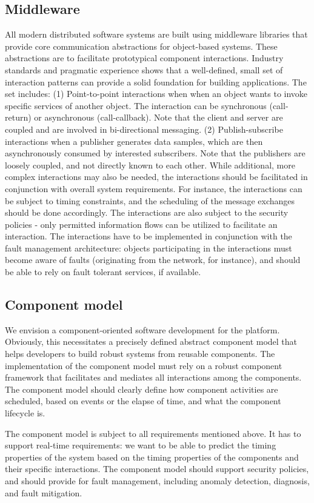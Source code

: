 \subsection{Middleware}
All modern distributed software systems are built using middleware
libraries that provide core communication abstractions for
object-based systems. These abstractions are to facilitate
prototypical component interactions. Industry standards and
pragmatic experience shows that a well-defined, small set of 
interaction patterns can provide a solid foundation for building
applications. The set includes: (1) Point-to-point interactions when
when an object wants to invoke specific services of another object. 
The interaction can be synchronous (call-return) or  asynchronous (call-callback). 
Note that the client and server are coupled and are involved in bi-directional messaging.
(2) Publish-subscribe interactions when a publisher generates data samples, 
which are then asynchronously consumed by interested subscribers. Note that the
publishers are loosely coupled, and not directly known to each other. 
While additional, more complex interactions may also be needed, the interactions
should be facilitated in conjunction with overall system requirements.
For instance, the interactions can be subject to timing constraints, and the scheduling
of the message exchanges should be done accordingly. The interactions
are also subject to the security policies - only permitted information
flows can be utilized to facilitate an interaction. The interactions
have to be implemented in conjunction with the fault management
architecture: objects participating in the interactions must become
aware of faults (originating from the network, for instance), and
should be able to rely on fault tolerant services, if available.

\vspace{-0.05in}
\subsection{Component model}

We envision a component-oriented software development for the
platform. Obviously, this necessitates a precisely defined abstract
component model that helps developers to build robust systems from
reusable components. The implementation of the component model 
must rely on a robust component framework that
facilitates and mediates all interactions among the components. The
component model should clearly define how component activities are
scheduled, based on events or the elapse of time, and what the
component lifecycle is.

The component model is subject to all requirements mentioned above. It
has to support real-time requirements: we want to be able to predict
the timing properties of the system based on the timing properties of
the components and their specific interactions. The component model
should support security policies, and should provide for
fault management, including anomaly detection, diagnosis, and fault
mitigation.
